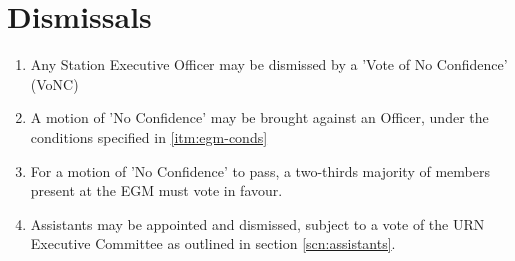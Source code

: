 \section{Dismissals}

\begin{enumerate}[label*=\thesection.\arabic*.]
    \item Any Station Executive Officer may be dismissed by a 'Vote of No Confidence' (VoNC)
    \item A motion of 'No Confidence' may be brought against an Officer, under the conditions specified in \ref{itm:egm-conds}
    \item For a motion of 'No Confidence' to pass, a two-thirds majority of members present at the EGM must vote in favour.
    \item Assistants may be appointed and dismissed, subject to a vote of the URN Executive Committee as outlined in section \ref{scn:assistants}.
\end{enumerate}
